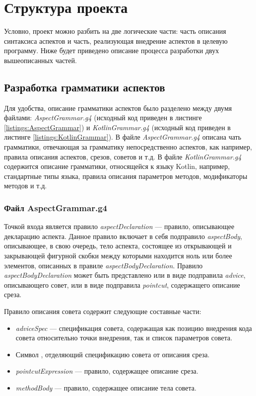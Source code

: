 \section{Структура проекта}
\label{sec:project_structure}
Условно, проект можно разбить на две логические части: часть описания
синтаксиса аспектов и часть, реализующая внедрение аспектов в целевую программу.
Ниже будет приведено описание процесса разработки двух вышеописанных частей.
\subsection{Разработка грамматики аспектов}
\label{sub:aspect_grammar_part_development}
Для удобства, описание грамматики аспектов было разделено между двумя файлами:
\textit{AspectGrammar.g4} (исходный код приведен в листинге
\ref{listings:AspectGrammar}) и \textit{KotlinGrammar.g4} (исходный код
приведен в листинге \ref{listings:KotlinGrammar}).
В файле \textit{AspectGrammar.g4} описана чать грамматики, отвечающая за
грамматику непосредственно аспектов, как например, правила описания аспектов,
срезов, советов и т.д.
В файле \textit{KotlinGrammar.g4} содержится описание грамматики, относящейся к
языку Kotlin, например, стандартные типы языка, правила описания параметров
методов, модификаторы методов и т.д.
\subsubsection{Файл AspectGrammar.g4}
\label{ssub:aspect_grammar_g4}
Точкой входа является правило \textit{aspectDeclaration} --- правило,
описывающее декларацию аспекта.
Данное правило включает в себя подправило \textit{aspectBody}, описывающее, в
свою очередь, тело аспекта, состоящее из открывающей и закрывающей фигурной
скобки между которыми находится ноль или более элементов, описанных в правиле
\textit{aspectBodyDeclaration}.
Правило \textit{aspectBodyDeclaration} может быть представлено или в виде
подправила \textit{advice}, описывающего совет, или в виде подправила
\textit{pointcut}, содержащего описание среза.

Правило описания совета содержит следующие составные части:
\begin{itemize}
	\item \textit{adviceSpec} --- спецификация совета, содержащая как позицию
		  внедрения кода совета относительно точки внедрения, так и список
		  параметров совета.
	\item Символ \quotes{:}, отделяющий спецификацию совета от описания среза.
	\item \textit{pointcutExpression} --- правило, содержащее описание среза.
	\item \textit{methodBody} --- правило, содержащее описание тела совета.
\end{itemize}

